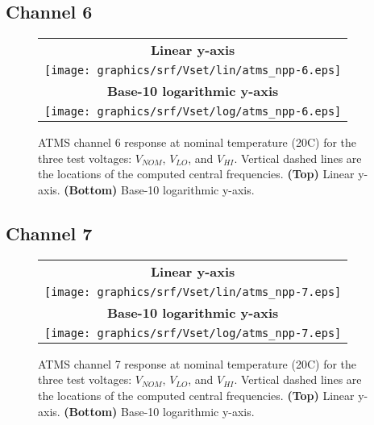 \subsection{Channel 6}
\begin{figure}[H]
  \label{fig:Vset.ch6_response}
  \centering
  \begin{tabular}{c}
    \hspace{0.75cm}\sffamily\textbf{Linear y-axis} \\
    \texttt{[image: graphics/srf/Vset/lin/atms\_npp-6.eps]} \\
    \hspace{0.75cm}\sffamily\textbf{Base-10 logarithmic y-axis} \\
    \texttt{[image: graphics/srf/Vset/log/atms\_npp-6.eps]}
  \end{tabular}
  \caption{ATMS channel 6 response at nominal temperature (20\textdegree{}C) for the three test voltages: $V_{NOM}$, $V_{LO}$, and $V_{HI}$. Vertical dashed lines are the locations of the computed central frequencies. \textbf{(Top)} Linear y-axis. \textbf{(Bottom)} Base-10 logarithmic y-axis.}
\end{figure}

\subsection{Channel 7}
\begin{figure}[H]
  \label{fig:Vset.ch7_response}
  \centering
  \begin{tabular}{c}
    \hspace{1.75cm}\sffamily\textbf{Linear y-axis} \\
    \texttt{[image: graphics/srf/Vset/lin/atms\_npp-7.eps]} \\
    \hspace{1.75cm}\sffamily\textbf{Base-10 logarithmic y-axis} \\
    \texttt{[image: graphics/srf/Vset/log/atms\_npp-7.eps]}
  \end{tabular}
  \caption{ATMS channel 7 response at nominal temperature (20\textdegree{}C) for the three test voltages: $V_{NOM}$, $V_{LO}$, and $V_{HI}$. Vertical dashed lines are the locations of the computed central frequencies. \textbf{(Top)} Linear y-axis. \textbf{(Bottom)} Base-10 logarithmic y-axis.}
\end{figure}

